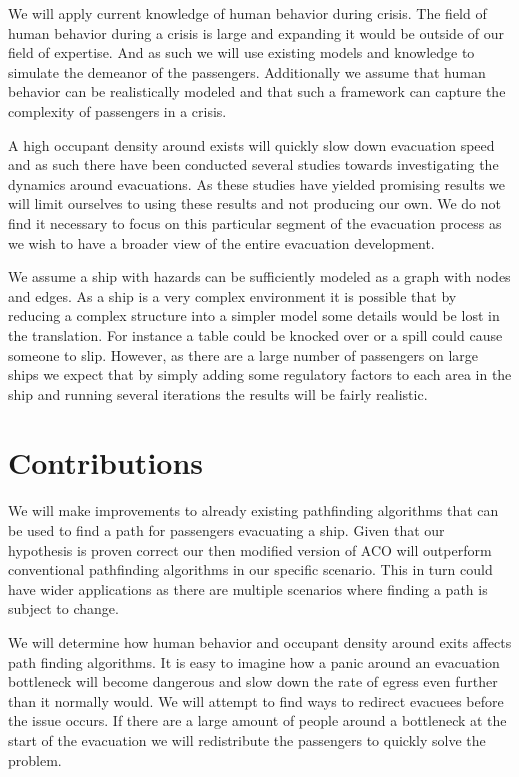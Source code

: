 We will apply current knowledge of human behavior during crisis. The field of human behavior during a crisis is large
and expanding it would be outside of our field of expertise. And as such we will use existing models and knowledge
to simulate the demeanor of the passengers. Additionally we assume that human behavior can be realistically modeled
and that such a framework can capture the complexity of passengers in a crisis.

A high occupant density around exists will quickly slow down evacuation speed and as such there have been conducted several studies
towards investigating the dynamics around evacuations. As these studies have yielded promising results we will
limit ourselves to using these results and not producing our own. We do not find it necessary to focus on this particular segment 
of the evacuation process as we wish to have a broader view of the entire evacuation development.

We assume a ship with hazards can be sufficiently modeled as a graph with nodes and edges. As a ship is a very complex
environment it is possible that by reducing a complex structure into a simpler model some details would be lost in the
translation. For instance a table could be knocked over or a spill could cause someone to slip. However, as there are a large number of 
passengers on large ships we expect that by simply adding some regulatory factors to each area in the ship and running
several iterations the results will be fairly realistic.

\section{Contributions}

 We will make improvements to already existing pathfinding algorithms that can be used to find a path 
for passengers evacuating a ship. Given that our hypothesis is proven
correct our then modified version of ACO will outperform conventional pathfinding algorithms in our 
specific scenario. This in turn could have wider applications as there are multiple scenarios
where finding a path is subject to change. 

We will determine how human behavior and occupant density around exits affects path finding algorithms.
It is easy to imagine how a panic around an evacuation bottleneck will become dangerous and slow
down the rate of egress even further than it normally would. We will attempt to find ways to redirect
evacuees before the issue occurs. If there are a large amount of people around a bottleneck at the
start of the evacuation we will redistribute the passengers to quickly solve the problem.

